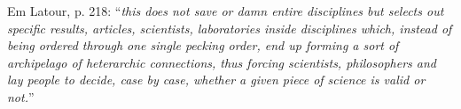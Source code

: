 Em Latour, p. 218: \enquote{\textit{this does not save or damn entire disciplines but selects out specific results, articles, scientists, laboratories inside disciplines which, instead of being ordered through one single pecking order, end up forming a sort of archipelago of heterarchic connections, thus forcing scientists, philosophers and lay people to decide, case by case, whether a given piece of science is valid or not.}}